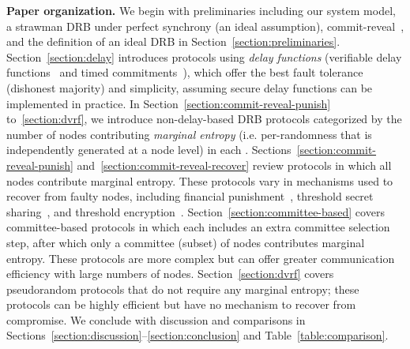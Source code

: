 \textbf{Paper organization.} We begin with preliminaries including our system model, a strawman DRB under perfect synchrony (an ideal assumption), commit-reveal~\cite{blum1983coin}, and the definition of an ideal DRB in Section~\ref{section:preliminaries}. Section~\ref{section:delay} introduces protocols using \textit{delay functions} (verifiable delay functions~\cite{boneh2018verifiable} and timed commitments~\cite{boneh2000timed}), which offer the best fault tolerance (dishonest majority) and simplicity, assuming secure delay functions can be implemented in practice. In Section~\ref{section:commit-reveal-punish} to~\ref{section:dvrf}, we introduce non-delay-based DRB protocols categorized by the number of nodes contributing \textit{marginal entropy} (i.e. per-\epoch randomness that is independently generated at a node level) in each \epoch. Sections~\ref{section:commit-reveal-punish} and~\ref{section:commit-reveal-recover} review protocols in which all nodes contribute marginal entropy. These protocols vary in mechanisms used to recover from faulty nodes, including financial punishment~\cite{youcai2017randao, david2020economically}, threshold secret sharing~\cite{schoenmakers1999simple, cascudo2017scrape}, and threshold encryption~\cite{desmedt1990Threshold}. Section~\ref{section:committee-based} covers committee-based protocols in which each \epoch includes an extra committee selection step, after which only a committee (subset) of nodes contributes marginal entropy. These protocols are more complex but can offer greater communication efficiency with large numbers of nodes. Section~\ref{section:dvrf} covers pseudorandom protocols that do not require any marginal entropy; these protocols can be highly efficient but have no mechanism to recover from compromise.
We conclude with discussion and comparisons in Sections~\ref{section:discussion}--\ref{section:conclusion} and Table~\ref{table:comparison}.
